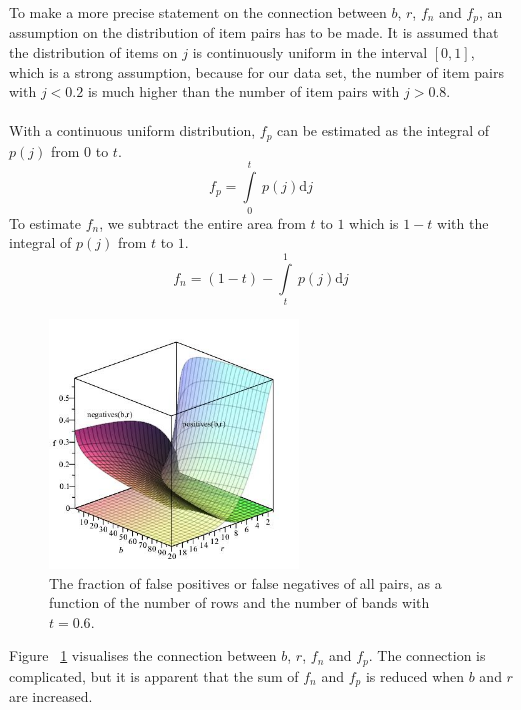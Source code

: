 To make a more precise statement on the connection between \(b\), \(r\), \(f_n\) and \(f_p\), an assumption on the distribution of item pairs has to be made. It is assumed that the distribution of items on \(j\) is continuously uniform in the interval \([0, 1]\), which is a strong assumption, because for our data set, the number of item pairs with \(j<0.2\) is much higher than the number of item pairs with \(j>0.8\).\\ \\
With a continuous uniform distribution, \(f_p\) can be estimated as the integral of \(p(j)\) from 0 to \(t\).
\[f_p = \int\limits_0^t\ p(j)\mathrm{d}j\]
To estimate \(f_n\), we subtract the entire area from \(t\) to \(1\) which is \(1-t\) with the integral of \(p(j)\) from \(t\) to \(1\).
\[f_n = (1-t)-\int\limits_t^1\ p(j)\mathrm{d}j\]

\begin{figure}[H]
	\centering
	\includegraphics[width=250px]{img/falseGraph.jpg}
	\caption{The fraction of false positives or false negatives of all pairs, as a function of the number of rows and the number of bands with \(t=0.6\).}
	\label{fig:false_graph}
\end{figure}

Figure ~\ref{fig:false_graph} visualises the connection between \(b\), \(r\), \(f_n\) and \(f_p\). The connection is complicated, but it is apparent that the sum of \(f_n\) and \(f_p\) is reduced when \(b\) and \(r\) are increased.

